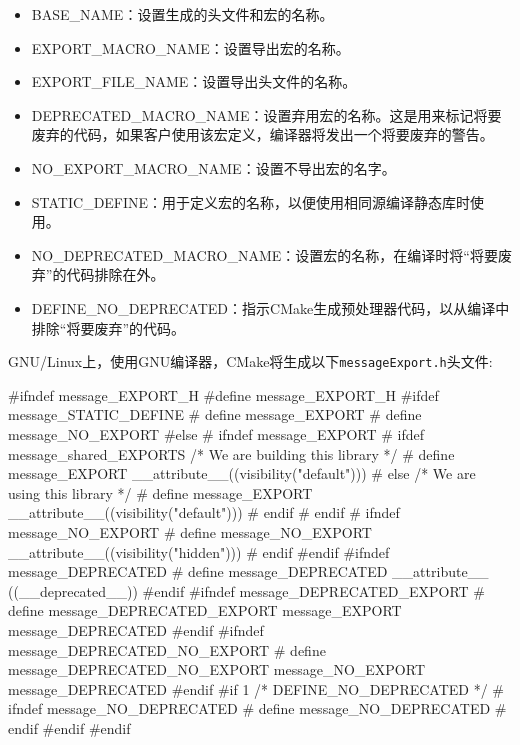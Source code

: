 \begin{itemize}
\item BASE\_NAME：设置生成的头文件和宏的名称。

\item EXPORT\_MACRO\_NAME：设置导出宏的名称。

\item EXPORT\_FILE\_NAME：设置导出头文件的名称。

\item DEPRECATED\_MACRO\_NAME：设置弃用宏的名称。这是用来标记将要废弃的代码，如果客户使用该宏定义，编译器将发出一个将要废弃的警告。

\item NO\_EXPORT\_MACRO\_NAME：设置不导出宏的名字。

\item STATIC\_DEFINE：用于定义宏的名称，以便使用相同源编译静态库时使用。

\item NO\_DEPRECATED\_MACRO\_NAME：设置宏的名称，在编译时将“将要废弃”的代码排除在外。

\item DEFINE\_NO\_DEPRECATED：指示CMake生成预处理器代码，以从编译中排除“将要废弃”的代码。

\end{itemize}

GNU/Linux上，使用GNU编译器，CMake将生成以下\texttt{messageExport.h}头文件:

\begin{codebox}[cmake]
#ifndef message_EXPORT_H
#define message_EXPORT_H
#ifdef message_STATIC_DEFINE
# define message_EXPORT
# define message_NO_EXPORT
#else
# ifndef message_EXPORT
# ifdef message_shared_EXPORTS
/* We are building this library */
# define message_EXPORT __attribute__((visibility("default")))
# else
/* We are using this library */
# define message_EXPORT __attribute__((visibility("default")))
# endif
# endif
# ifndef message_NO_EXPORT
# define message_NO_EXPORT __attribute__((visibility("hidden")))
# endif
#endif
#ifndef message_DEPRECATED
# define message_DEPRECATED __attribute__ ((__deprecated__))
#endif
#ifndef message_DEPRECATED_EXPORT
# define message_DEPRECATED_EXPORT message_EXPORT message_DEPRECATED
#endif
#ifndef message_DEPRECATED_NO_EXPORT
# define message_DEPRECATED_NO_EXPORT message_NO_EXPORT message_DEPRECATED
#endif
#if 1 /* DEFINE_NO_DEPRECATED */
# ifndef message_NO_DEPRECATED
# define message_NO_DEPRECATED
# endif
#endif
#endif
\end{codebox}

